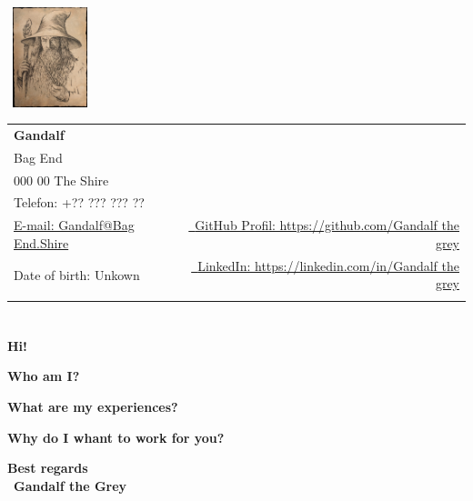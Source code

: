 \documentclass[a4paper,11pt]{article}
\makeatletter
\newcommand{\name}{Gandalf} %
\newcommand{\city}{000 00 The Shire} %
\newcommand{\addr}{Bag End} %
\newcommand{\phone}{+?? ??? ??? ??} %
\newcommand{\emaila}{Gandalf@Bag End.Shire} %
\newcommand{\birth}{Unkown} %
\makeatother
\begin{document}
\selectfont


\parbox{2.6cm}{%
\includegraphics[width=2.5cm,clip,height=2.9cm]{Gandalf.png} %
}
\parbox{\dimexpr\linewidth-3cm\relax}{
\begin{tabularx}{\linewidth}{L r} \\
  \textbf{\Large \name} & {}\\
  \addr & {} \\
  \city & {} \\
  {Telefon: \phone} & {} \\
  \href{mailto:\emaila}{E-mail: \emaila} & \href{https://github.com/}{\raisebox{0.0\height}{\footnotesize \faGithub}\ {GitHub Profil: https://github.com/Gandalf the grey}} \\
  {Date of birth: \birth} & \href{https://www.linkedin.com/}{\raisebox{0.0\height}{\footnotesize \faLinkedin}\ {LinkedIn: https://linkedin.com/in/Gandalf the grey}} \\
  \vfill
\end{tabularx}
}

\vspace{-10.0mm}

\section{ }

\vspace{12mm}

\textbf{\large Hi!}

\vspace{4mm}

\raggedright

\textbf{Who am I?} \\
\vspace{1mm}
\lipsum[1]

\vspace{4mm}
\textbf{What are my experiences?} \\
\vspace{1mm}
\lipsum[1]

\vspace{4mm}
\lipsum[1]


\vspace{4mm}
\textbf{Why do I whant to work for you?} \\
\vspace{1mm}
\lipsum[1]

\vspace{6mm}
\textbf{Best regards} \\
~\textbf{Gandalf the Grey}
\end{document}

